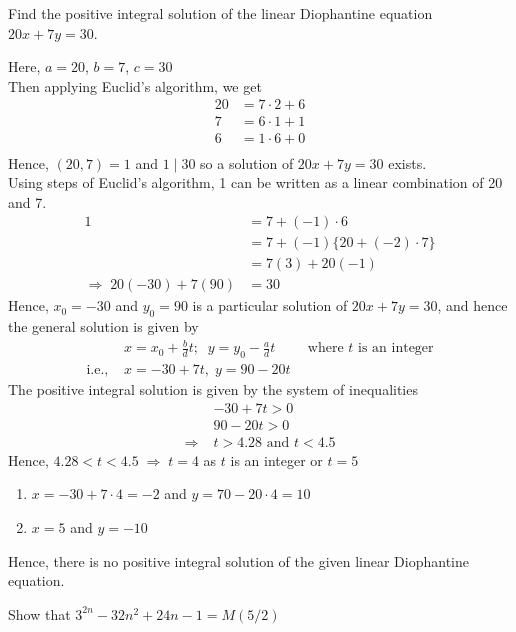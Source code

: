\documentclass[12pt,class=book,crop=false]{standalone}
\begin{document}
\begin{qn}[T-3]
    Find the positive integral solution of the linear Diophantine equation $ 20x+7y=30 $.
\end{qn}
\begin{soln}
    Here, $ a=20 $, $ b=7 $, $ c=30 $\\
    Then applying Euclid's algorithm, we get
    \begin{align*}
        20&=7\cdot 2+6\\
        7&=6\cdot 1+1\\
        6&=1\cdot 6+0\\
    \end{align*}
    Hence, $ (20,7)=1 $ and $ 1\mid 30 $ so a solution of $ 20x+7y=30 $ exists.\\
    Using steps of Euclid's algorithm, 1 can be written as a linear combination of 20 and 7.
    \begin{align*}
        1&=7+(-1)\cdot 6\\
        &=7+(-1)\{20+(-2)\cdot 7\}\\
        &=7(3)+20(-1)\\
        \Rightarrow\;20(-30)+7(90)&=30
    \end{align*}
    Hence, $ x_0=-30 $ and $ y_0=90 $ is a particular solution of $ 20x+7y=30 $, and hence the general solution is given by
    \begin{align*}
        & x=x_0+\frac{b}{d}t;\;\;y=y_0-\frac{a}{d}t\qquad\text{ where } t \text{ is an integer}\\
        \text{i.e., }& x=-30+7t,\;y=90-20t
    \end{align*}
    The positive integral solution is given by the system of inequalities
    \begin{align*}
        &-30+7t>0\\
        &90-20t>0\\
        \Rightarrow\;&t>4.28\text{ and } t<4.5
    \end{align*}
    Hence, $ 4.28<t<4.5 \;\Rightarrow\;t=4 $ as $ t $ is an integer or $ t=5 $
    \begin{enumerate}[label=(\roman*)]
        \item $ x=-30+7\cdot 4=-2 $ and $ y=70-20\cdot 4=10 $
        \item $ x=5 $ and $ y=-10 $
    \end{enumerate}
    Hence, there is no positive integral solution of the given linear Diophantine equation.
\end{soln}
\begin{qn}
    Show that $ 3^{2n}-32n^2+24n-1=M(5/2) $
\end{qn}
\end{document}
